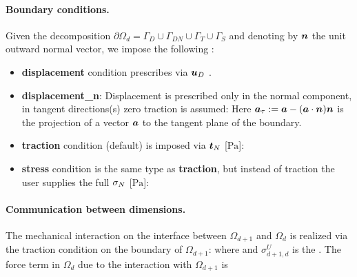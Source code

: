 \paragraph{Boundary conditions.}
Given the decomposition $\partial\Omega_d=\Gamma_D\cup\Gamma_{DN}\cup\Gamma_T\cup\Gamma_S$ and denoting by $\mathbf{\boldsymbol{n}}$ the unit outward normal vector, we impose the following :
\begin{itemize}
\item \textbf{displacement} condition prescribes
via  $\mathbf{\boldsymbol{u}}_D$ .
\item \textbf{displacement\_n}: Displacement is prescribed only in the normal component, in tangent directions(s) zero traction is assumed:
Here $\mathbf{\boldsymbol{a}}_\tau := \mathbf{\boldsymbol{a}} - (\mathbf{\boldsymbol{a}}\cdot\mathbf{\boldsymbol{n}})\mathbf{\boldsymbol{n}}$ is the projection of a vector $\mathbf{\boldsymbol{a}}$ to the tangent plane of the boundary.
\item \textbf{traction} condition (default) is imposed via  $\mathbf{\boldsymbol{t}}_N$ [$\mathrm{Pa}$]:
\item \textbf{stress} condition is the same type as \textbf{traction}, but instead of traction the user supplies the full  ${\mathbb{\sigma}}_N$ [$\mathrm{Pa}$]:
\end{itemize}


\paragraph{Communication between dimensions.}
The mechanical interaction on the interface between $\Omega_{d+1}$ and $\Omega_d$ is realized via the traction condition on the boundary of $\Omega_{d+1}$:
where
and $\sigma^U_{d+1,d}$ \units{}{}{} is the .
The force term in $\Omega_d$ due to the interaction with $\Omega_{d+1}$ is

